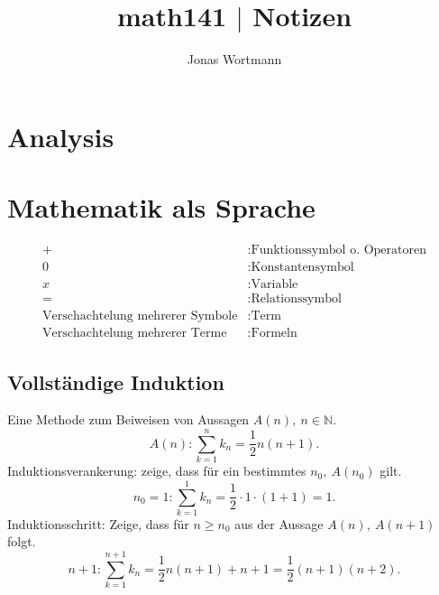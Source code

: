 \documentclass[a4paper,12pt]{article}
\numberwithin{equation}{section}
\begin{document}

\title{math141 $|$ Notizen}
\author{Jonas Wortmann}
\maketitle
{}


\newpage


\fancyhead[L]{\thepage}
\fancyfoot[C]{}

\tableofcontents


\newpage


\fancyhead[R]{\leftmark\\\rightmark}

\section*{Analysis}
\section{Mathematik als Sprache}
\begin{align*}
        +&:\text{Funktionssymbol o. Operatoren}\\
        0&:\text{Konstantensymbol}\\
        x&:\text{Variable}\\
        =&:\text{Relationssymbol}\\
        \text{Verschachtelung mehrerer Symbole}&:\text{Term}\\
        \text{Verschachtelung mehrerer Terme}&:\text{Formeln}
\end{align*}

\subsection{Vollständige Induktion}
Eine Methode zum Beiweisen von Aussagen $A\left( n\right) ,\ n  \in \mathbb{N}$.
\[ 
A\left( n\right) :\sum_{k=1}^{n}k_n=\dfrac{1}{2}n\left( n+1\right) 
.\] 
Induktionsverankerung: zeige, dass für ein bestimmtes $n_0,\ A\left( n_0\right) $ gilt.
\[ 
n_0=1:\sum_{k=1}^{1}k_n=\dfrac{1}{2}\cdot 1\cdot \left( 1+1\right) =1
.\] 
Induktionsschritt: Zeige, dass für $n\geq n_0$ aus der Aussage $A\left( n\right),\ A\left( n+1\right) $ folgt.
\[ 
n+1:\sum_{k=1}^{n+1}k_n=\dfrac{1}{2}n\left( n+1\right) +n+1=\dfrac{1}{2}\left( n+1\right) \left( n+2\right) 
.\] 
\end{document}
